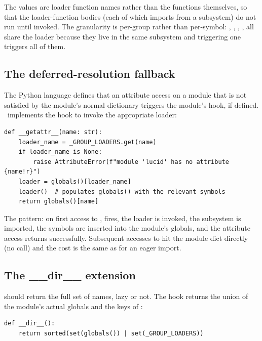 The values are loader function names rather than the functions
themselves, so that the loader-function bodies (each of which
imports from a subsystem) do not run until invoked. The granularity
is per-group rather than per-symbol: , ,
, ,  all share the
 loader because they live in the same
subsystem and triggering one triggers all of them.

\subsection{The deferred-resolution fallback}
\label{ssec:lazy_imports:fallback}

The Python language defines that an attribute access on a module
that is not satisfied by the module's normal dictionary triggers
the module's  hook, if defined. \Lucid\
implements the hook to invoke the appropriate loader:

\begin{lstlisting}[style=lucid,language=LucidPython]
def __getattr__(name: str):
    loader_name = _GROUP_LOADERS.get(name)
    if loader_name is None:
        raise AttributeError(f"module 'lucid' has no attribute {name!r}")
    loader = globals()[loader_name]
    loader()  # populates globals() with the relevant symbols
    return globals()[name]
\end{lstlisting}

The pattern: on first access to , 
fires, the loader is invoked, the subsystem is imported, the
symbols are inserted into the module's globals, and the attribute
access returns successfully. Subsequent accesses to 
hit the module dict directly (no \code{\_\_getattr\_\_} call) and
the cost is the same as for an eager import.

\subsection{The \_\_dir\_\_ extension}
\label{ssec:lazy_imports:dir}

 should return the full set of names, lazy or
not. The  hook returns the union of the module's
actual globals and the keys of \code{\_GROUP\_LOADERS}:

\begin{lstlisting}[style=lucid,language=LucidPython]
def __dir__():
    return sorted(set(globals()) | set(_GROUP_LOADERS))
\end{lstlisting}

